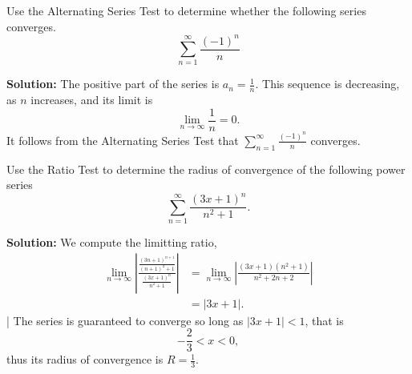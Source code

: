 \documentclass[11pt]{exam}
\begin{document}
\begin{questions}

\newpage
\addpoints 
\question[1] Use the Alternating Series Test to determine whether the following series converges. 
\begin{equation*}
\sum_{n=1}^{\infty} \frac{(-1)^n}{n}
\end{equation*}

\textbf{Solution:} The positive part of the series is $a_n=\frac{1}{n}$. This sequence is decreasing, as $n$ increases, and its limit is 
\begin{equation*}
\lim_{n \to \infty} \frac{1}{n} = 0.
\end{equation*}
It follows from the Alternating Series Test that $\sum_{n=1}^{\infty} \frac{(-1)^n}{n}$ converges. 

\newpage
\addpoints
\question[2] Use the Ratio Test to determine the radius of convergence of the following power series
\begin{equation*}
\sum_{n=1}^{\infty} \frac{(3x+1)^n}{n^2+1}.
\end{equation*}

\textbf{Solution:} We compute the limitting ratio, 
\begin{align*}
\lim_{n \to \infty} \left| \frac{\frac{(3n+1)^{n+1}}{(n+1)^2+1}}{\frac{(3x+1)^n}{n^2+1}}\right| & = \lim_{n \to \infty} \left| \frac{(3x+1)(n^2+1)}{n^2+2n+2} \right| \\ 
& = |3x+1|.
\end{align*}|
The series is guaranteed to converge so long as $|3x+1|<1$, that is 
\begin{equation*}
-\frac{2}{3} < x < 0, 
\end{equation*}
thus its radius of convergence is $R=\frac{1}{3}$. 
\end{questions}
\end{document}
